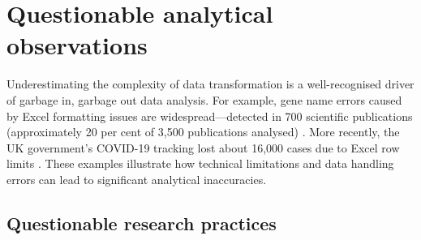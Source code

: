 \documentclass{article}
\begin{document}
\tableofcontents
\listoftables
\listoffigures


\section{Questionable analytical observations}

Underestimating the complexity of data transformation is a well-recognised driver of garbage in, garbage out data analysis. For example, gene name errors caused by Excel formatting issues are widespread---detected in 700 scientific publications (approximately 20 per cent of 3,500 publications analysed) \cite{ziemann2016gene}. More recently, the UK government's COVID-19 tracking lost about 16,000 cases due to Excel row limits \cite{bbc2020excel}. These examples illustrate how technical limitations and data handling errors can lead to significant analytical inaccuracies.

\subsection{Questionable research practices}
\end{document}
